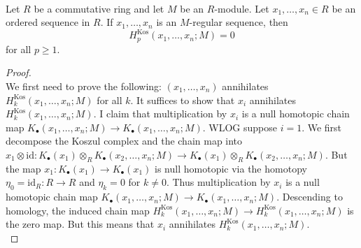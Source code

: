 \documentclass[a4paper]{article}
\begin{document}
\begin{prp}{}{}\\
Let $R$ be a commutative ring and let $M$ be an $R$-module. Let $x_1,\dots,x_n\in R$ be an ordered sequence in $R$. If $x_1,\dots,x_n$ is an $M$-regular sequence, then $$H_p^\text{Kos}(x_1,\dots,x_n;M)=0$$ for all $p\geq 1$. 
\begin{proof}\\
We first need to prove the following: $(x_1,\dots,x_n)$ annihilates $H_k^\text{Kos}(x_1,\dots,x_n;M)$ for all $k$. It suffices to show that $x_i$ annihilates $H_k^\text{Kos}(x_1,\dots,x_n;M)$. I claim that multiplication by $x_i$ is a null homotopic chain map $K_\bullet(x_1,\dots,x_n;M)\to K_\bullet(x_1,\dots,x_n;M)$. WLOG suppose $i=1$. We first decompose the Koszul complex and the chain map into $x_1\otimes\text{id}:K_\bullet(x_1)\otimes_RK_\bullet(x_2,\dots,x_n;M)\to K_\bullet(x_1)\otimes_RK_\bullet(x_2,\dots,x_n;M)$. But the map $x_1:K_\bullet(x_1)\to K_\bullet(x_1)$ is null homotopic via the homotopy $\eta_0=\text{id}_R:R\to R$ and $\eta_k=0$ for $k\neq 0$. Thus multiplication by $x_i$ is a null homotopic chain map $K_\bullet(x_1,\dots,x_n;M)\to K_\bullet(x_1,\dots,x_n;M)$. Descending to homology, the induced chain map $H_k^\text{Kos}(x_1,\dots,x_n;M)\to H_k^\text{Kos}(x_1,\dots,x_n;M)$ is the zero map. But this means that $x_i$ annihilates $H_k^\text{Kos}(x_1,\dots,x_n;M)$. \\


\end{proof}
\end{prp}
\end{document}
